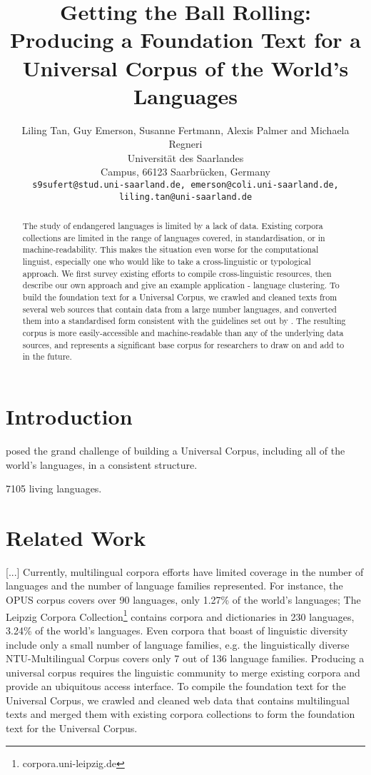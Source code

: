 \documentclass[11pt]{article}
\title{Getting the Ball Rolling: Producing a Foundation Text for a Universal Corpus of the World's Languages}
\author{Liling Tan, Guy Emerson, Susanne Fertmann, Alexis Palmer and Michaela Regneri \\
  Universität des Saarlandes \\
  Campus, 66123 Saarbrücken, Germany \\
  {\tt s9sufert@stud.uni-saarland.de, emerson@coli.uni-saarland.de,} \\
  {\tt liling.tan@uni-saarland.de}}
\date{}
\begin{document}
\maketitle
\begin{abstract}
The study of endangered languages is limited by a lack of data. Existing corpora collections are limited in the range of languages covered, in standardisation, or in machine-readability. This makes the situation even worse for the computational linguist, especially one who would like to take a cross-linguistic or typological approach. We first survey existing efforts to compile cross-linguistic resources, then describe our own approach and give an example application - language clustering. To build the foundation text for a Universal Corpus, we crawled and cleaned texts from several web sources that contain data from a large number languages, and converted them into a standardised form consistent with the guidelines set out by . The resulting corpus is more easily-accessible and machine-readable than any of the underlying data sources, and represents a significant base corpus for researchers to draw on and add to in the future.
\end{abstract}

\section{Introduction}

 posed the grand challenge of building a Universal Corpus, including all of the world's languages, in a consistent structure.

7105 living languages.


\section{Related Work}

[...]
Currently, multilingual corpora efforts have limited coverage in the number of languages and the number of language families represented. For instance, the OPUS corpus \cite{tiedemann2012opus} covers over 90 languages, only 1.27\% of the world's languages; The Leipzig Corpora Collection\footnote{corpora.uni-leipzig.de} \cite{biemann2007leipzig} contains corpora and dictionaries in 230 languages, 3.24\% of the world's languages. Even corpora that boast of linguistic diversity include only a small number of language families, e.g. the linguistically diverse NTU-Multilingual Corpus \cite{tan2011ntu} covers only 7 out of 136 language families. Producing a universal corpus requires the linguistic community to merge existing corpora and provide an ubiquitous access interface. To compile the foundation text for the Universal Corpus, we crawled and cleaned web data that contains multilingual texts and merged them with existing corpora collections to form the foundation text for the Universal Corpus.
\end{document}
